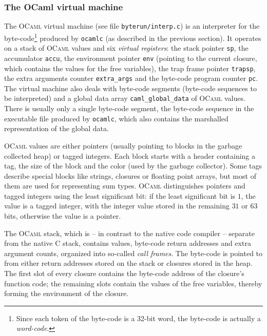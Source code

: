 \documentclass[10pt,a4paper,twocolumn]{article}
\begin{document}
\subsubsection{The OCaml virtual machine}

The \textsc{OCaml} virtual machine (see file \texttt{byterun/interp.c}) is an interpreter for the
byte-code\footnote{Since each token of the byte-code is a 32-bit word, the byte-code is actually
  a \emph{word-code}.} produced by \texttt{ocamlc} (as described in the previous section). It operates on a 
stack of \textsc{OCaml} values and six \emph{virtual registers}: the stack pointer \texttt{sp},
the accumulator \texttt{accu}, the environment pointer \texttt{env} (pointing to the current
closure, which contains the values for the free variables), the trap frame pointer \texttt{trapsp},
the extra arguments counter \texttt{extra\_args} and the byte-code program counter \texttt{pc}.
The virtual machine also deals with byte-code segments (byte-code sequences to be interpreted)
and a global data array \texttt{caml\_global\_data} of \textsc{OCaml} values. There is usually
only a single byte-code segment, the byte-code sequence in the executable file produced by
\texttt{ocamlc}, which also contains the marshalled representation of the global data.

\textsc{OCaml} values are either pointers (usually pointing to blocks in the garbage collected
heap) or tagged integers. Each block starts with a header containing a tag, the size of the block
and the color (used by the garbage collector). Some tags describe special blocks like strings,
closures or floating point arrays, but most of them are used for representing sum types.
\textsc{OCaml} distinguishes pointers and tagged integers using the least significant bit: if
the least significant bit is $1$, the value is a tagged integer, with the integer value stored
in the remaining $31$ or $63$ bits, otherwise the value is a pointer.

The \textsc{OCaml} stack, which is -- in contrast to the native code compiler -- separate from
the native C stack, contains values, byte-code return addresses and extra argument counts,
organized into so-called \emph{call frames}. The byte-code is pointed to from either return
addresses stored on the stack or closures stored in the heap. The first slot of every closure
contains the byte-code address of the closure's function code; the remaining slots contain
the values of the free variables, thereby forming the environment of the closure.
\end{document}
